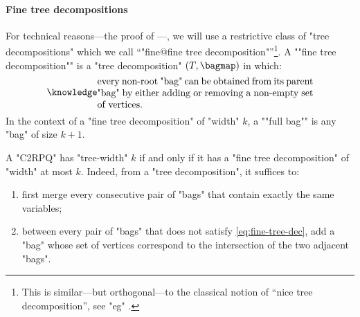 

\paragraph*{Fine tree decompositions}
    \AP
	For technical reasons---the proof of ---, we will use a restrictive class of "tree decompositions" which we call ``"fine@fine tree decomposition"''\footnote{This is similar---but orthogonal---to the classical notion of
	``nice tree decomposition'', see "eg" \cite[Definition 13.1.4, page 149]{kloks1994treewidth}.}. A \AP""fine tree decomposition"" is a "tree decomposition" $(T, \bagmap)$ in which:
	\begin{equation}
		\AP\label{eq:fine-tree-dec}
		\parbox{.65\linewidth}{every non-root "bag" can be obtained from its parent "bag" by
		either adding or removing a non-empty set of vertices.}%
	\end{equation}
	In the context of a "fine tree decomposition" of "width" $k$, a \AP""full bag"" is any "bag" of size $k+1$.
	
    A "C2RPQ" has "tree-width" $k$ if and only if it has a "fine tree decomposition" of "width" at most $k$. Indeed, from a "tree decomposition", it suffices to:
	\begin{enumerate}
		\item first merge every consecutive pair of "bags" that contain exactly the same variables;
		\item between every pair of "bags"
		that does not satisfy \eqref{eq:fine-tree-dec}, add a "bag" whose set of vertices
		correspond to the intersection of the two adjacent "bags".
	\end{enumerate}
    

